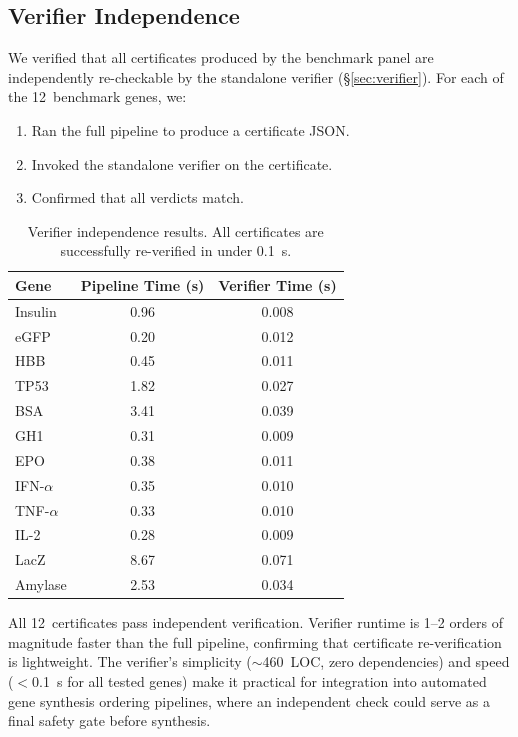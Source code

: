 \subsection{Verifier Independence}\label{sec:verifiereval}

We verified that all certificates produced by the benchmark panel are
independently re-checkable by the standalone verifier
(\S\ref{sec:verifier}).  For each of the 12~benchmark genes, we:

\begin{enumerate}[leftmargin=*,itemsep=0pt,topsep=1pt]
\item Ran the full pipeline to produce a certificate JSON.
\item Invoked the standalone verifier on the certificate.
\item Confirmed that all verdicts match.
\end{enumerate}

\begin{table}[!htbp]
\centering
\caption{Verifier independence results.  All certificates are
         successfully re-verified in under 0.1~s.}
\label{tab:verifier}
\begin{tabular}{lcc}
\toprule
\textbf{Gene} & \textbf{Pipeline Time (s)} & \textbf{Verifier Time (s)} \\
\midrule
Insulin      & 0.96  & 0.008 \\
eGFP         & 0.20  & 0.012 \\
HBB          & 0.45  & 0.011 \\
TP53         & 1.82  & 0.027 \\
BSA          & 3.41  & 0.039 \\
GH1          & 0.31  & 0.009 \\
EPO          & 0.38  & 0.011 \\
IFN-$\alpha$ & 0.35  & 0.010 \\
TNF-$\alpha$ & 0.33  & 0.010 \\
IL-2         & 0.28  & 0.009 \\
LacZ         & 8.67  & 0.071 \\
Amylase      & 2.53  & 0.034 \\
\bottomrule
\end{tabular}
\end{table}

All 12~certificates pass independent verification.  Verifier runtime is
1--2 orders of magnitude faster than the full pipeline, confirming that
certificate re-verification is lightweight.  The verifier's simplicity
($\sim$460~LOC, zero dependencies) and speed ($<$0.1~s for all tested
genes) make it practical for integration into automated gene synthesis
ordering pipelines, where an independent check could serve as a final
safety gate before synthesis.



